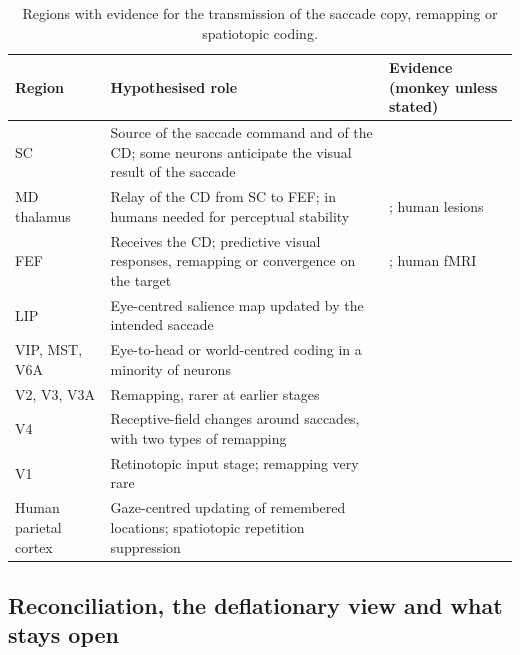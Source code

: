 \documentclass[14pt]{article}
\begin{document}
\begin{table}[h]
\centering\footnotesize
\setlength{\tabcolsep}{3pt}
\begin{tabular}{@{}>{\raggedright\arraybackslash}p{3.1cm}>{\raggedright\arraybackslash}p{6.2cm}>{\raggedright\arraybackslash}p{6.3cm}@{}}
\hline
Region & Hypothesised role & Evidence (monkey unless stated) \\
\hline
SC & Source of the saccade command and of the CD; some neurons anticipate the visual result of the saccade & \citet{walkerNeuronsMonkeySuperior1995} \\
MD thalamus & Relay of the CD from SC to FEF; in humans needed for perceptual stability & \citet{sommerInfluenceThalamusSpatial2006}; human lesions \citet{ostendorfHumanThalamusContributes2010} \\
FEF & Receives the CD; predictive visual responses, remapping or convergence on the target & \citet{umenoSpatialProcessingMonkey1997,zirnsakVisualSpaceCompressed2014}; human fMRI \citet{fairhallSpatiotopicUpdatingSaccades2017} \\
LIP & Eye-centred salience map updated by the intended saccade & \citet{duhamelUpdatingRepresentationVisual1992,colbySpaceAttentionParietal1999} \\
VIP, MST, V6A & Eye-to-head or world-centred coding in a minority of neurons & \citet{duhamelSpatialInvarianceVisual1997,ilgPosteriorParietalCortex2004} \\
V2, V3, V3A & Remapping, rarer at earlier stages & \citet{nakamuraUpdatingVisualRepresentation2002} \\
V4 & Receptive-field changes around saccades, with two types of remapping & \citet{neupaneTwoDistinctTypes2016} \\
V1 & Retinotopic input stage; remapping very rare & \citet{nakamuraUpdatingVisualRepresentation2002} \\
Human parietal cortex & Gaze-centred updating of remembered locations; spatiotopic repetition suppression & \citet{medendorpGazecenteredUpdatingVisual2003,merriamSpatialUpdatingHuman2003,fairhallSpatiotopicUpdatingSaccades2017} \\
\hline
\end{tabular}
\caption{Regions with evidence for the transmission of the saccade copy, remapping or spatiotopic coding.}
\label{tab:substrates}
\end{table}

\subsection{Reconciliation, the deflationary view and what stays open}
\end{document}
